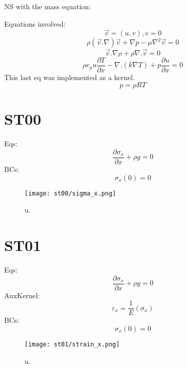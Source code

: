 \documentclass[11pt,letterpaper]{article}
\begin{document}
NS with the mass equation:

Equations involved:
\begin{equation}
\vec{v}=(u,v), v = 0
\end{equation}
\begin{equation}
\rho (\vec{v}.\nabla)\vec{v} + \nabla p - \mu \nabla^{2}\vec{v} = 0
\end{equation}
\begin{equation}
\vec{v}.\nabla \rho + \rho \nabla.\vec{v}=0
\end{equation}
\begin{equation}
\rho c_{p} u \frac{\partial T}{\partial x} - \nabla .(k\nabla T) + p \frac{\partial u}{\partial x} = 0
\end{equation}
This last eq was implemented as a kernel.
\begin{equation}
p = \rho R T
\end{equation}

\section{ST00}

Eqs:
\begin{equation}
\frac{\partial \sigma_x}{\partial x} + \rho g = 0
\end{equation}
BCs:
\begin{equation}
\sigma_x (0) = 0
\end{equation}

\begin{figure*}[!h]
	\centering
	\texttt{[image: st00/sigma\_x.png]}
	\hfill
	\caption{u.}
	\label{fig:st00}
\end{figure*}

\section{ST01}

Eqs:
\begin{equation}
\frac{\partial \sigma_x}{\partial x} + \rho g = 0
\end{equation}
AuxKernel:
\begin{equation}
\varepsilon_x = \frac{1}{E}(\sigma_x)
\end{equation}
BCs:
\begin{equation}
\sigma_x (0) = 0
\end{equation}

\begin{figure*}[!h]
	\centering
	\texttt{[image: st01/strain\_x.png]}
	\hfill
	\caption{u.}
	\label{fig:st01}
\end{figure*}
\end{document}
